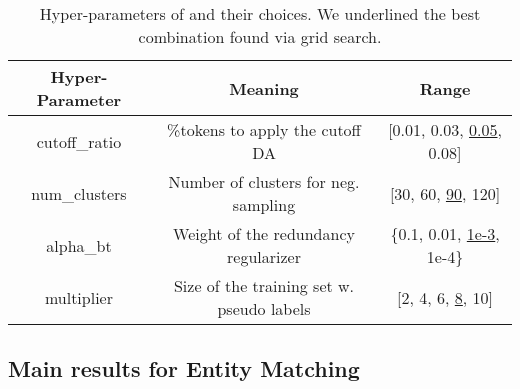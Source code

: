 \begin{table}[!ht]
\centering
\scriptsize
\caption{Hyper-parameters of \system and their choices.
We underlined the best combination found via grid search.}
\label{tab:hyperparameters}
\begin{tabular}{ccc}
\toprule
Hyper-Parameter & Meaning                                         & Range  \\ \midrule
cutoff\_ratio   & \%tokens to apply the cutoff DA                 & {[}0.01, 0.03, \underline{0.05}, 0.08{]}                                                                            \\
num\_clusters   & Number of clusters for neg. sampling        & {[}30, 60, \underline{90}, 120{]}                                                                                \\
alpha\_bt       & Weight of the redundancy regularizer            & \{0.1, 0.01, \underline{1e-3}, 1e-4\}
\\
multiplier      & Size of the training set w. pseudo labels & {[}2, 4, 6, \underline{8}, 10{]} \\ \bottomrule                                                
\end{tabular}\vspace{-2mm}
\end{table}


\subsection{Main results for Entity Matching}






\iffalse

